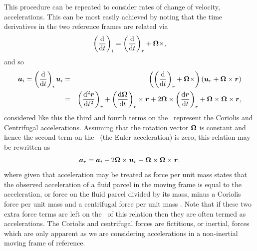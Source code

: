 This procedure can be repeated to consider rates of change of velocity, \ie accelerations. This can be most
easily achieved by noting that the time derivatives in the two reference frames are related via
\begin{equation*}
\left(\frac{\mathrm{d}}{\mathrm{d} t}\right)_i=\left(\frac{\mathrm{d}}{\mathrm{d} t}\right)_r + {\mbox{\boldmath$\Omega$}}\times,
\end{equation*}
and so 
\begin{eqnarray*}
{\mbox{\boldmath$a$}}_i=\left(\frac{\mathrm{d}}{\mathrm{d} t}\right)_i{\mbox{\boldmath$u$}}_i &=& \left(\left(\frac{\mathrm{d}}{\mathrm{d} t}\right)_r + {\mbox{\boldmath$\Omega$}}\times\right)\left({\mbox{\boldmath$u$}}_r+{\mbox{\boldmath$\Omega$}}\times{\mbox{\boldmath$r$}}\right)\\
&=&\left(\frac{\mathrm{d}^2{\mbox{\boldmath$r$}}}{\mathrm{d} t^2}\right)_r + \left(\frac{\mathrm{d}{\mbox{\boldmath$\Omega$}}}{\mathrm{d} t}\right)_r\times{\mbox{\boldmath$r$}} + 2{\mbox{\boldmath$\Omega$}}\times\left(\frac{\mathrm{d}{\mbox{\boldmath$r$}}}{\mathrm{d} t}\right)_r + {\mbox{\boldmath$\Omega$}}\times{\mbox{\boldmath$\Omega$}}\times{\mbox{\boldmath$r$}},
\end{eqnarray*}
considered like this the third and fourth terms on the \rhs\ represent the Coriolis and Centrifugal accelerations.
Assuming that the rotation vector ${\mbox{\boldmath$\Omega$}}$ is constant and hence the second term on the \rhs\ (the Euler acceleration) 
is zero, this relation may be rewritten as
\begin{equation*}
{\mbox{\boldmath$a$}}_r = {\mbox{\boldmath$a$}}_i - 2{\mbox{\boldmath$\Omega$}}\times{\mbox{\boldmath$u$}}_r - {\mbox{\boldmath$\Omega$}}\times{\mbox{\boldmath$\Omega$}}\times{\mbox{\boldmath$r$}}.
\end{equation*}
where given that acceleration may be treated as force per unit mass states that the observed acceleration of a fluid parcel in the moving frame
is equal to the acceleration, or force on the fluid parcel divided by its mass, minus a Coriolis force per unit mass and a centrifugal force per unit mass \citep[chap. 2]{vallis2006}. Note that if these two extra force terms are left on the \lhs\ of this relation then they are often termed as accelerations.
The Coriolis and centrifugal forces are fictitious, or inertial, forces which are only apparent as we are considering accelerations in a non-inertial
moving frame of reference.

